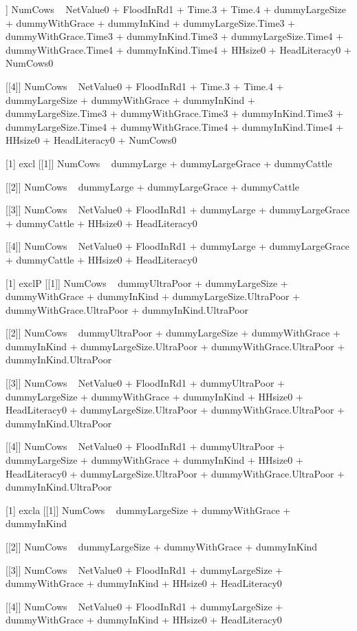 \begin{Schunk}
\begin{Soutput}
[[3]]
NumCows ~ NetValue0 + FloodInRd1 + Time.3 + Time.4 + dummyLargeSize + 
    dummyWithGrace + dummyInKind + dummyLargeSize.Time3 + dummyWithGrace.Time3 + 
    dummyInKind.Time3 + dummyLargeSize.Time4 + dummyWithGrace.Time4 + 
    dummyInKind.Time4 + HHsize0 + HeadLiteracy0 + NumCows0

[[4]]
NumCows ~ NetValue0 + FloodInRd1 + Time.3 + Time.4 + dummyLargeSize + 
    dummyWithGrace + dummyInKind + dummyLargeSize.Time3 + dummyWithGrace.Time3 + 
    dummyInKind.Time3 + dummyLargeSize.Time4 + dummyWithGrace.Time4 + 
    dummyInKind.Time4 + HHsize0 + HeadLiteracy0 + NumCows0

[1] excl
[[1]]
NumCows ~ dummyLarge + dummyLargeGrace + dummyCattle

[[2]]
NumCows ~ dummyLarge + dummyLargeGrace + dummyCattle

[[3]]
NumCows ~ NetValue0 + FloodInRd1 + dummyLarge + dummyLargeGrace + 
    dummyCattle + HHsize0 + HeadLiteracy0

[[4]]
NumCows ~ NetValue0 + FloodInRd1 + dummyLarge + dummyLargeGrace + 
    dummyCattle + HHsize0 + HeadLiteracy0

[1] exclP
[[1]]
NumCows ~ dummyUltraPoor + dummyLargeSize + dummyWithGrace + 
    dummyInKind + dummyLargeSize.UltraPoor + dummyWithGrace.UltraPoor + 
    dummyInKind.UltraPoor

[[2]]
NumCows ~ dummyUltraPoor + dummyLargeSize + dummyWithGrace + 
    dummyInKind + dummyLargeSize.UltraPoor + dummyWithGrace.UltraPoor + 
    dummyInKind.UltraPoor

[[3]]
NumCows ~ NetValue0 + FloodInRd1 + dummyUltraPoor + dummyLargeSize + 
    dummyWithGrace + dummyInKind + HHsize0 + HeadLiteracy0 + 
    dummyLargeSize.UltraPoor + dummyWithGrace.UltraPoor + dummyInKind.UltraPoor

[[4]]
NumCows ~ NetValue0 + FloodInRd1 + dummyUltraPoor + dummyLargeSize + 
    dummyWithGrace + dummyInKind + HHsize0 + HeadLiteracy0 + 
    dummyLargeSize.UltraPoor + dummyWithGrace.UltraPoor + dummyInKind.UltraPoor

[1] excla
[[1]]
NumCows ~ dummyLargeSize + dummyWithGrace + dummyInKind

[[2]]
NumCows ~ dummyLargeSize + dummyWithGrace + dummyInKind

[[3]]
NumCows ~ NetValue0 + FloodInRd1 + dummyLargeSize + dummyWithGrace + 
    dummyInKind + HHsize0 + HeadLiteracy0

[[4]]
NumCows ~ NetValue0 + FloodInRd1 + dummyLargeSize + dummyWithGrace + 
    dummyInKind + HHsize0 + HeadLiteracy0


\end{Soutput}
\end{Schunk}
